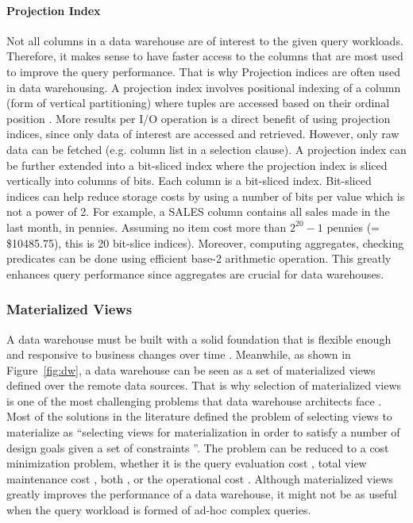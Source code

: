 \documentclass[12pt,a4paper]{article}
\begin{document}
\paragraph{Projection Index}
Not all columns in a data warehouse are of interest to the given query workloads. Therefore, it makes sense to have faster access to the columns that are
most used to improve the query performance. That is why Projection indices are often used in data warehousing. A projection index involves positional indexing
of a column (form of vertical partitioning) where tuples are accessed based on their ordinal position \cite{datta2002parallel}. More results per I/O operation
is a direct benefit of using projection indices, since only data of interest are accessed and retrieved. However, only raw data can be fetched (e.g. column
list in a selection clause). A projection index can be further extended into a bit-sliced index \cite{oneil1997improved} where the projection index is sliced
vertically into columns of bits. Each column is a bit-sliced index. Bit-sliced indices can help reduce storage costs by using a number of bits per value which
is not a power of 2. For example, a SALES column contains all sales made in the last month, in pennies. Assuming no item cost more than $2^{20} - 1$ pennies (=
\$10485.75), this is 20 bit-slice indices). Moreover, computing aggregates, checking predicates can be done using efficient base-2 arithmetic operation. This
greatly enhances query performance since aggregates are crucial for data warehouses.

\subsubsection{Materialized Views}
A data warehouse must be built with a solid foundation that is flexible enough and responsive to business changes over time \cite{armstrong1997data}.
Meanwhile, as shown in Figure~\ref{fig:dw}, a data warehouse can be seen as a set of materialized views defined over the remote data sources. That is why
selection of materialized
views is one of the most challenging problems that data warehouse architects face \cite{theodoratos2000general}. Most of the solutions in the literature
defined the problem of selecting views to materialize as \textquotedblleft selecting views for materialization in order to satisfy a number of design goals
given a set of constraints \textquotedblright. The problem can be reduced to a cost minimization problem, whether it is the query evaluation cost
\cite{harinarayan1996implementing}, total view maintenance cost \cite{kenneth1996materialized}, both \cite{yang1997algorithms}, or the operational cost
\cite{elena1997materialized, gupta2005selection, theodoratos1999designing, theodoratos1997data, theodoratos1999designingdw, theodoratos2000incremental,
yang1997algorithms}. Although materialized views greatly improves the performance of a data warehouse, it might not be as useful when the query workload is
formed of ad-hoc complex queries.
\end{document}
